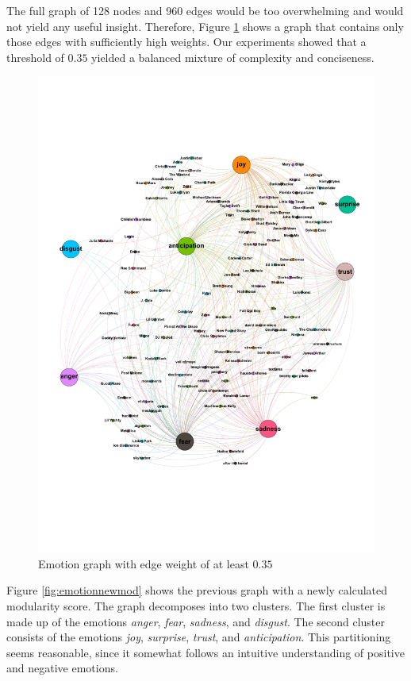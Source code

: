 \documentclass[10pt,a4paper]{article}
\begin{document}
		The full graph of 128 nodes and 960 edges would be too overwhelming and would not yield any useful insight. Therefore, Figure \ref{fig:emotiongraph} shows a graph that contains only those edges with sufficiently high weights. Our experiments showed that a threshold of $0.35$ yielded a balanced mixture of complexity and conciseness.
		
		\begin{figure}[htb]
			\centering
			\includegraphics[trim=0mm 50mm 0mm 50mm, clip, width=\linewidth]{data/emotion_graph}
			\caption{Emotion graph with edge weight of at least $0.35$}
			\label{fig:emotiongraph}
		\end{figure}
		
		Figure \ref{fig:emotionnewmod} shows the previous graph with a newly calculated modularity score. The graph decomposes into two clusters. The first cluster is made up of the emotions \textit{anger}, \textit{fear}, \textit{sadness}, and \textit{disgust}. The second cluster consists of the emotions \textit{joy}, \textit{surprise}, \textit{trust}, and \textit{anticipation}. This partitioning seems reasonable, since it somewhat follows an intuitive understanding of positive and negative emotions.
		
\end{document}
